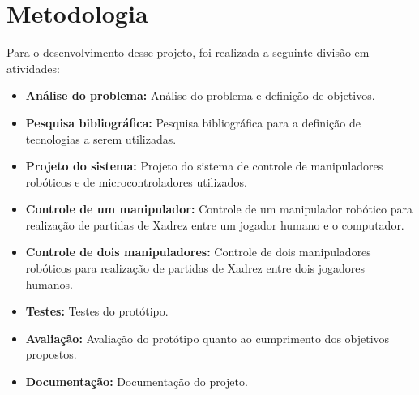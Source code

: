 \chapter[Metodologia]{Metodologia}
\label{cap:metodologia}

Para o desenvolvimento desse projeto, foi realizada a seguinte divisão em atividades:

\begin{itemize}
    \item \textbf{Análise do problema:} Análise do problema e definição de objetivos.
    \item \textbf{Pesquisa bibliográfica:} Pesquisa bibliográfica para a definição de tecnologias a serem utilizadas.
    \item \textbf{Projeto do sistema:} Projeto do sistema de controle de manipuladores robóticos e de microcontroladores utilizados.
    \item \textbf{Controle de um manipulador:} Controle de um manipulador robótico para realização de partidas de Xadrez entre um jogador humano e o computador.
    \item \textbf{Controle de dois manipuladores:} Controle de dois manipuladores robóticos para realização de partidas de Xadrez entre dois jogadores humanos.
    \item \textbf{Testes:} Testes do protótipo.
    \item \textbf{Avaliação:} Avaliação do protótipo quanto ao cumprimento dos objetivos propostos.
    \item \textbf{Documentação:} Documentação do projeto.
\end{itemize}
